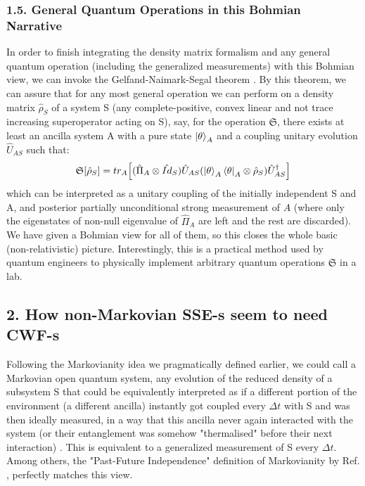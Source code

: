 \documentclass[11pt, a4paper]{article} %
\begin{document}
\subsubsection*{1.5. General Quantum Operations in this Bohmian Narrative}\vspace{-0.2cm}

In order to finish integrating the density matrix formalism and any general quantum operation (including the generalized measurements) with this Bohmian view, we can invoke the Gelfand-Naimark-Segal theorem \cite{GNSTheorem, Generalized}. By this theorem, we can assure that for any most general operation we can perform on a density matrix $\hat{\rho}_S$ of a system S (any complete-positive, convex linear and not trace increasing superoperator acting on S), say, for the operation $\mathfrak{S}$, there exists at least an ancilla system A with a pure state $\ket{\theta}_A$ and a coupling unitary evolution $\hat{U}_{AS}$ such that:\vspace{-0.15cm}
\begin{equation}
\mathfrak{S}[\hat{\rho}_S]=tr_A\qty[ (\hat{\Pi}_A\otimes \hat{Id}_S)  \hat{U}_{AS}\qty(\ket{\theta}_A\bra{\theta}_A\otimes \hat{\rho}_S)\hat{U}_{AS}^\dagger]
\end{equation}
which can be interpreted as a unitary coupling of the initially independent S and A, and posterior partially unconditional strong measurement of $A$ (where only the eigenstates of non-null eigenvalue of $\hat{\Pi}_A$ are left and the rest are discarded). We have given a Bohmian view for all of them, so this closes the whole basic (non-relativistic) picture. Interestingly, this is a practical method used by quantum engineers to physically implement arbitrary quantum operations $\mathfrak{S}$ in a lab.\vspace{-0.1cm}


\subsection*{2. How non-Markovian SSE-s seem to need CWF-s}
Following the Markovianity idea we pragmatically defined earlier, we could call a Markovian open quantum system, any evolution of the reduced density of a subsystem S that could be equivalently interpreted as if a different portion of the environment (a different ancilla) instantly got coupled every $\Delta t$ with S and was then ideally measured, in a way that this ancilla never again interacted with the system (or their entanglement was somehow "thermalised" before their next interaction) \cite{QuantumTrajs}. This is equivalent to a generalized measurement of S every $\Delta t$. Among others, the "Past-Future Independence" definition of Markovianity by Ref. \cite{MarkovianityDefs}, perfectly matches this view.
\end{document}
